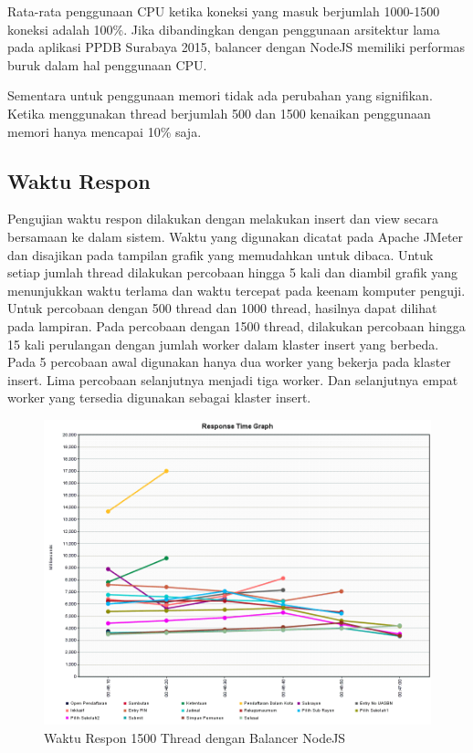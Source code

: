 \documentclass{ta-its}
\begin{document}
					Rata-rata penggunaan CPU ketika koneksi yang masuk berjumlah 1000-1500 koneksi adalah 100\%. Jika dibandingkan dengan penggunaan arsitektur lama pada aplikasi PPDB Surabaya 2015, balancer dengan NodeJS memiliki performas buruk dalam hal penggunaan CPU. 
					
					Sementara untuk penggunaan memori tidak ada perubahan yang signifikan. Ketika menggunakan thread berjumlah 500 dan 1500 kenaikan penggunaan memori hanya mencapai 10\% saja.
				
				\subsection{Waktu Respon}
					Pengujian waktu respon dilakukan dengan melakukan insert dan view secara bersamaan ke dalam sistem. Waktu yang digunakan dicatat pada Apache JMeter dan disajikan pada tampilan grafik yang memudahkan untuk dibaca. Untuk setiap jumlah thread dilakukan percobaan hingga 5 kali dan diambil grafik yang menunjukkan	waktu terlama dan waktu tercepat pada keenam komputer penguji.
					Untuk percobaan dengan 500 thread dan 1000 thread, hasilnya dapat dilihat pada lampiran. Pada percobaan dengan 1500 thread, dilakukan percobaan hingga 15 kali perulangan dengan jumlah worker dalam klaster insert yang berbeda. Pada 5 percobaan awal digunakan hanya dua worker yang bekerja pada klaster insert. Lima percobaan selanjutnya menjadi tiga worker. Dan selanjutnya empat worker yang tersedia digunakan sebagai klaster insert.
					
					\begin{figure}[h] %
						\centering
						\includegraphics[width=\linewidth]{contoh_img/1500/balancer}
						\caption{Waktu Respon 1500 Thread dengan Balancer NodeJS}
						\label{gambar1500nodejs}
					\end{figure}
					
\end{document}
